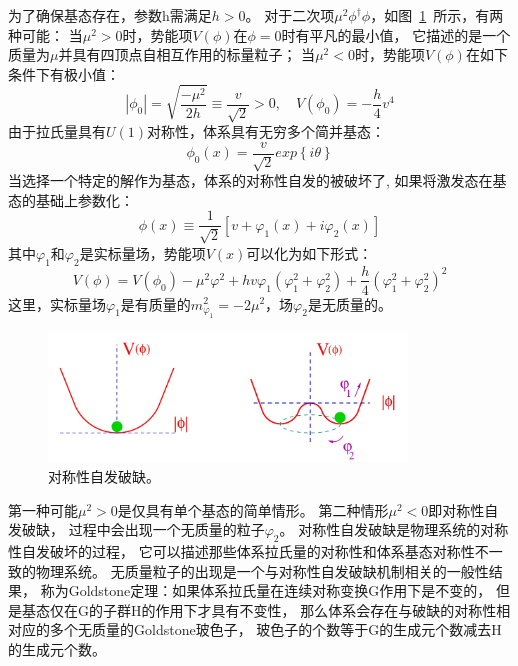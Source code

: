 为了确保基态存在，参数h需满足$h>0$。
对于二次项$\mu^2 \phi^{\dagger} \phi$，如图~\ref{fig:SSB1}~所示，有两种可能：
当$\mu^2>0$时，势能项$V(\phi)$在$\phi=0$时有平凡的最小值，
它描述的是一个质量为$\mu$并具有四顶点自相互作用的标量粒子；
当$\mu^2<0$时，势能项$V(\phi)$在如下条件下有极小值：
\begin{equation} 
\label{eq:SSB3}
|\phi_0|= \sqrt{\frac{-\mu^2}{2h}} \equiv \frac{v}{\sqrt{2}} >0 , \quad V(\phi_0)=-\frac{h}{4}v^4
\end{equation}
由于拉氏量具有$U(1)$对称性，体系具有无穷多个简并基态：
\begin{equation} 
\label{eq:SSB4}
\phi_0(x)=\frac{v}{\sqrt{2}}exp\left\{ i\theta\right\}
\end{equation}
当选择一个特定的解作为基态，体系的对称性自发的被破坏了,
如果将激发态在基态的基础上参数化：
\begin{equation} 
\label{eq:SSB5}
\phi(x) \equiv \frac{1}{\sqrt{2}}\left[ v+ \varphi_1(x) + i	\varphi_2(x) \right]
\end{equation}
其中$\varphi_1$和$\varphi_2$是实标量场，势能项$V(x)$可以化为如下形式：
\begin{equation} 
\label{eq:SSB6}
V(\phi)=V(\phi_0)- \mu^2 \varphi^2+ hv\varphi_1(\varphi^2_1+ \varphi^2_2)+ \frac{h}{4}(\varphi^2_1+ \varphi^2_2)^2
\end{equation}
这里，实标量场$\varphi_1$是有质量的$m_{\varphi_1}^2=-2\mu^2$，场$\varphi_2$是无质量的。

\begin{figure}
  \begin{center}
    \includegraphics[width=0.85\textwidth]{figuresTHE/SSB.jpg}
  \end{center}
  \caption{
对称性自发破缺。
}
    \label{fig:SSB1}
\end{figure}


第一种可能$\mu^2>0$是仅具有单个基态的简单情形。
第二种情形$\mu^2<0$即对称性自发破缺，
过程中会出现一个无质量的粒子$\varphi_2$。
对称性自发破缺是物理系统的对称性自发破坏的过程，
它可以描述那些体系拉氏量的对称性和体系基态对称性不一致的物理系统。
无质量粒子的出现是一个与对称性自发破缺机制相关的一般性结果，
称为Goldstone定理：如果体系拉氏量在连续对称变换G作用下是不变的，
但是基态仅在G的子群H的作用下才具有不变性，
那么体系会存在与破缺的对称性相对应的多个无质量的Goldstone玻色子，
玻色子的个数等于G的生成元个数减去H的生成元个数。

